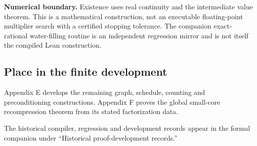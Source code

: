 \textbf{Numerical boundary.} Existence uses real continuity and the intermediate value theorem. This is a mathematical construction, not an executable floating-point multiplier search with a certified stopping tolerance. The companion exact-rational water-filling routine is an independent regression mirror and is not itself the compiled Lean construction.



\subsection{Place in the finite development}\label{supp4:subsection:007}
Appendix E develops the remaining graph, schedule, counting and preconditioning constructions. Appendix F proves the global small-core recompression theorem from its stated factorization data.

The historical compiler, regression and development records appear in the formal companion under ``Historical proof-development records.''
